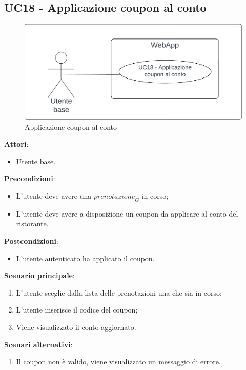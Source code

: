 \subsection{UC18 - Applicazione coupon al conto} \label{usecase:18}
\begin{figure}[H]
    \centering
    \includegraphics[width=0.9\linewidth]{ucd/ucd18.png}
    \caption{Applicazione coupon al conto}
\end{figure}
\textbf{Attori}:
\begin{itemize}
    \item Utente base.
\end{itemize}
\textbf{Precondizioni}:
\begin{itemize}
    \item L'utente deve avere una $\textit{prenotazione}_G$ in corso;
    \item L'utente deve avere a disposizione un coupon da applicare al conto del ristorante.
\end{itemize}
\textbf{Postcondizioni}:
\begin{itemize}
    \item L'utente autenticato ha applicato il coupon.
\end{itemize}
\textbf{Scenario principale}:
\begin{enumerate}
    \item L'utente sceglie dalla lista delle prenotazioni una che sia in corso;
    \item L'utente inserisce il codice del coupon;
    \item Viene visualizzato il conto aggiornato.
\end{enumerate}
\textbf{Scenari alternativi}:
\begin{enumerate}
    \item Il coupon non è valido, viene visualizzato un messaggio di errore.
\end{enumerate}
\newpage